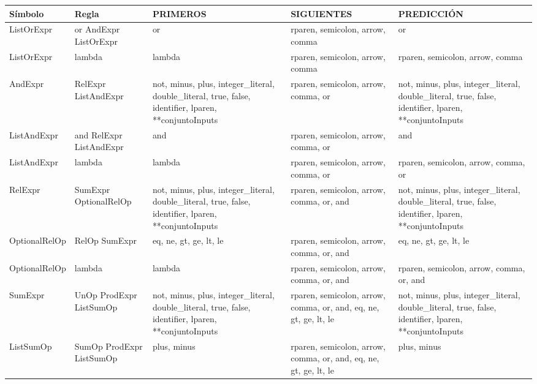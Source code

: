 \begin{tabularx}{\textwidth}{BBBBB}
          \toprule
          Símbolo & Regla & PRIMEROS & SIGUIENTES & PREDICCIÓN \\ \hline
          \midrule
ListOrExpr & or AndExpr ListOrExpr & or    & rparen, semicolon, arrow, comma & or \\ \hline
               ListOrExpr & lambda & lambda & rparen, semicolon, arrow, comma & rparen, semicolon, arrow, comma \\ \hline
                     
               AndExpr & RelExpr ListAndExpr & not, minus, plus, integer\_literal, double\_literal, true, false, identifier, lparen, **conjuntoInputs & rparen, semicolon, arrow, comma, or & not, minus, plus, integer\_literal, double\_literal, true, false, identifier, lparen, **conjuntoInputs \\ \hline
               ListAndExpr & and RelExpr ListAndExpr & and   & rparen, semicolon, arrow, comma, or & and \\ \hline
               ListAndExpr & lambda & lambda & rparen, semicolon, arrow, comma, or & rparen, semicolon, arrow, comma, or \\ \hline
                     
               RelExpr & SumExpr OptionalRelOp & not, minus, plus, integer\_literal, double\_literal, true, false, identifier, lparen, **conjuntoInputs & rparen, semicolon, arrow, comma, or, and & not, minus, plus, integer\_literal, double\_literal, true, false, identifier, lparen, **conjuntoInputs \\ \hline
               OptionalRelOp & RelOp SumExpr & eq, ne, gt, ge, lt, le & rparen, semicolon, arrow, comma, or, and & eq, ne, gt, ge, lt, le \\ \hline
               OptionalRelOp & lambda & lambda & rparen, semicolon, arrow, comma, or, and & rparen, semicolon, arrow, comma, or, and \\ \hline

                     
               SumExpr & UnOp ProdExpr ListSumOp & not, minus, plus, integer\_literal, double\_literal, true, false, identifier, lparen, **conjuntoInputs & rparen, semicolon, arrow, comma, or, and, eq, ne, gt, ge, lt, le & not, minus, plus, integer\_literal, double\_literal, true, false, identifier, lparen, **conjuntoInputs \\ \hline
               ListSumOp & SumOp ProdExpr ListSumOp & plus, minus & rparen, semicolon, arrow, comma, or, and, eq, ne, gt, ge, lt, le & plus, minus \\ \hline



 \bottomrule
               \end{tabularx}%

